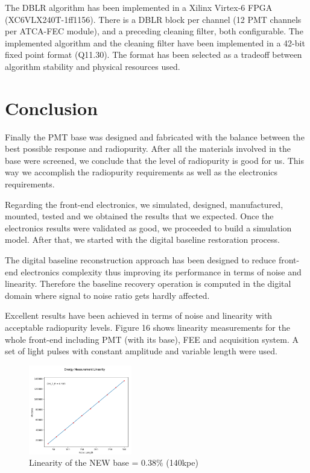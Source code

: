 \documentclass[a4paper, 10pt, oneside, twocolumn, 3p]{elsarticle}
\begin{document}
\par The DBLR algorithm has been implemented in a Xilinx Virtex-6 FPGA (XC6VLX240T-1ff1156). There is a DBLR block per channel (12 PMT channels per ATCA-FEC module), and a preceding cleaning filter, both configurable. The implemented algorithm and the cleaning filter have been implemented in a 42-bit fixed point format (Q11.30). The format has been selected as a tradeoff between algorithm stability and physical resources used.


\section{Conclusion}

\par Finally the PMT base was designed and fabricated with the balance between the best possible response and radiopurity. After all the materials involved in the base were screened, we conclude that the level of radiopurity is good for us.  This way we accomplish the radiopurity requirements as well as the electronics requirements.

\par Regarding the front-end electronics, we simulated, designed, manufactured, mounted, tested and we obtained the results that we expected. Once the electronics results were validated as good, we proceeded to build a simulation model. After that, we started with the digital baseline restoration process.

\par The digital baseline reconstruction approach has been designed to reduce front-end electronics complexity thus improving its performance in terms of noise and linearity. Therefore the baseline recovery operation is computed in the digital domain where signal to noise ratio gets hardly affected.

\par Excellent results have been achieved in terms of noise and linearity with acceptable radiopurity levels. Figure 16 shows linearity measurements for the whole front-end including PMT (with its base), FEE and acquisition system. A set of light pulses with constant amplitude and variable length were used.  

\begin{figure}[H]
	\begin{center}
		\includegraphics[width=0.4\textwidth]{./figures/7C_lin}
		\caption{Linearity of the NEW base = $0.38\%$ (140kpe)}
		\label{fig:linearity}
	\end{center}
\end{figure}
\end{document}
